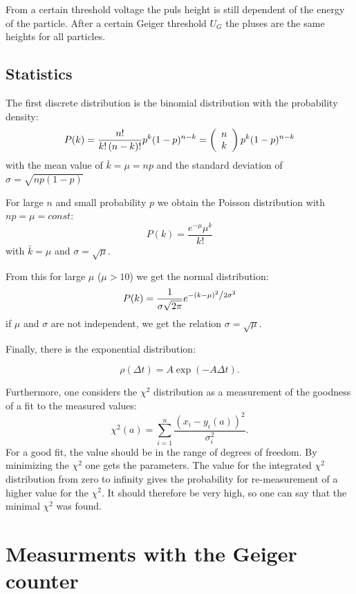 From a certain threshold voltage the puls height is still dependent of the energy of the particle. After a certain Geiger threshold $U_G$ the pluses are the same heights for all particles.

\subsection{Statistics}

The first discrete distribution is the binomial distribution with the probability density:
$$ P(k) = \frac{{n!}}{{k!\left( {n - k} \right)!}}p^k (1-p)^{n - k} = \left( {\begin{array}{*{20}c} n \\ k \\ \end{array}} \right)p^k (1-p)^{n - k}$$
with the mean value of $\bar{k}=\mu=np$ and the standard deviation of $\sigma=\sqrt{np(1-p)}$

For large $n$ and small probability $p$ we obtain the Poisson distribution with $np= \mu=const$:
$$P\left( k \right) = \frac{{e^{ - \mu } \mu ^k }}{{k!}}$$
with $\bar{k}=\mu$ and $\sigma=\sqrt{\mu}$.

From this for large $\mu$ ($\mu>10$) we get the normal distribution:
$$P(k) = \frac{1}{{\sigma \sqrt {2\pi } }}e^{{{ - \left( {k - \mu } \right)^2 } \mathord{\left/ {\vphantom {{ - \left( {k - \mu } \right)^2 } {2\sigma ^2 }}} \right. \kern-\nulldelimiterspace} {2\sigma ^2 }}}$$
if $\mu$ and $\sigma$ are not independent, we get the relation $\sigma =\sqrt{\mu}$.

Finally, there is the exponential distribution:

$$\rho(\Delta t)= A\exp(-A\Delta t).$$

Furthermore, one considers the $\chi^2$ distribution as a measurement of the goodness of a fit to the measured values:
$$\chi^2(a)=\sum_{i=1}^{n}{\dfrac{(x_i-y_i(a))^2}{\sigma_i^2}}.$$
For a good fit, the value should be in the range of degrees of freedom.
By minimizing the $\chi^2$ one gets the parameters.
The value for the integrated $\chi^2$ distribution from zero to infinity gives the probability for re-measurement of a higher value for the $\chi^2$.
It should therefore be very high, so one can say that the minimal $\chi^2$ was found.

\section{Measurments with the Geiger counter}

